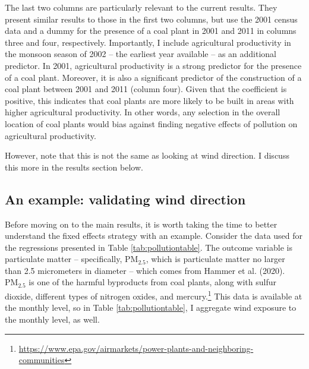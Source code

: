 \documentclass[
]{article}
\begin{document}
The last two columns are particularly relevant to the current results. They present similar results to those in the first two columns, but use the 2001 census data and a dummy for the presence of a coal plant in 2001 and 2011 in columns three and four, respectively. Importantly, I include agricultural productivity in the monsoon season of 2002 -- the earliest year available -- as an additional predictor. In 2001, agricultural productivity is a strong predictor for the presence of a coal plant. Moreover, it is also a significant predictor of the construction of a coal plant between 2001 and 2011 (column four). Given that the coefficient is positive, this indicates that coal plants are more likely to be built in areas with higher agricultural productivity. In other words, any selection in the overall location of coal plants would bias against finding negative effects of pollution on agricultural productivity.

However, note that this is not the same as looking at wind direction. I discuss this more in the results section below.

\hypertarget{an-example-validating-wind-direction}{%
\subsection{\texorpdfstring{An example: validating wind direction \label{validation}}{An example: validating wind direction }}\label{an-example-validating-wind-direction}}

Before moving on to the main results, it is worth taking the time to better understand the fixed effects strategy with an example. Consider the data used for the regressions presented in Table \ref{tab:pollutiontable}. The outcome variable is particulate matter -- specifically, \(\mathrm{PM_{2.5}}\), which is particulate matter no larger than 2.5 micrometers in diameter -- which comes from Hammer et al. (2020). \(\mathrm{PM_{2.5}}\) is one of the harmful byproducts from coal plants, along with sulfur dioxide, different types of nitrogen oxides, and mercury.\footnote{\url{https://www.epa.gov/airmarkets/power-plants-and-neighboring-communities}} This data is available at the monthly level, so in Table \ref{tab:pollutiontable}, I aggregate wind exposure to the monthly level, as well.
\end{document}
